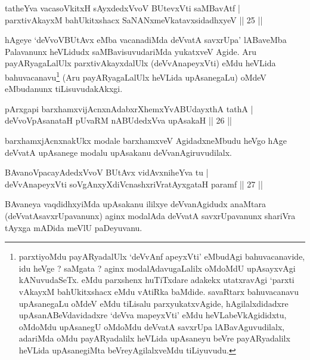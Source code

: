 \begin{shl}
tatheYva vacasoVkitxH sAyxdedxVvoV BUtevxVti saMBavAtf |\\
parxtivAkayxM bahUkitxshacx SaNANxmeVkatavxsidadhxyeV \hfill || 25 || 
\end{shl}

\begin{artha}
hAgeye  `deVvoVBUtAvx eMba vacanadiMda deVvatA savxrUpa' lABaveMba Palavanunx heVLidudx saMBavisuvudariMda yukatxveV Agide. Aru payARyagaLalUlx parxtivAkayxdalUlx (deVvAnapeyxVti) eMdu heVLida bahuvacanavu\footnote{parxtiyoMdu payARyadalUlx `deVvAnf apeyxVti' eMbudAgi bahuvacanavide, idu heVge ? saMgata ? aginx modalAdavugaLalilx oMdoMdU upAsayxvAgi kANuvudaSeTx. eMdu parxshenx huTiTxdare adakekx utatxravAgi `parxti vAkayxM bahUkitxshacx eMdu vAtiRka baMdide. savaRtarx bahuvacanavu upAsanegaLu oMdeV eMdu tiLisalu parxyukatxvAgide, hAgilalxdidadxre upAsanABeVdavidadxre `deVva mapeyxVti' eMdu heVLabeVkAgididxtu, oMdoMdu upAsanegU oMdoMdu deVvatA savxrUpa lABavAguvudilalx, adariMda oMdu payARyadalilx heVLida upAsaneyu beVre payARyadalilx heVLida upAsanegiMta beVreyAgilalxveMdu tiLiyuvudu.} (Aru payARyagaLalUlx heVLida upAsanegaLu) oMdeV eMbudanunx tiLisuvudakAkxgi.
\end{artha}


\begin{shl}
pArxgapi barxhamxvijAcnxnAdabxrXhemxYvABUdayxthA tathA |\\
deVvoVpAsanataH pUvaRM nABUdedxVva upAsakaH \hfill || 26 || 
\end{shl}

\begin{artha}
barxhamxjAcnxnakUkx modale barxhamxveV AgidadxneMbudu heVgo hAge deVvatA upAsanege modalu upAsakanu deVvanAgiruvudilalx. 
\end{artha}


\begin{shl}
BAvanoVpacayAdedxVvoV BUtAvx vidAvxniheYva tu |\\
deVvAnapeyxVti soV\s gAnxyXdiVcnashxriVratAyxgataH paramf \hfill || 27 || 
\end{shl}

\begin{artha}
BAvaneya vaqdidhxyiMda upAsakanu ililxye deVvanAgidudx anaMtara (deVvatAsavxrUpavanunx) aginx modalAda deVvatA savxrUpavanunx shariVra tAyxga mADida meVlU paDeyuvanu.
\end{artha}

